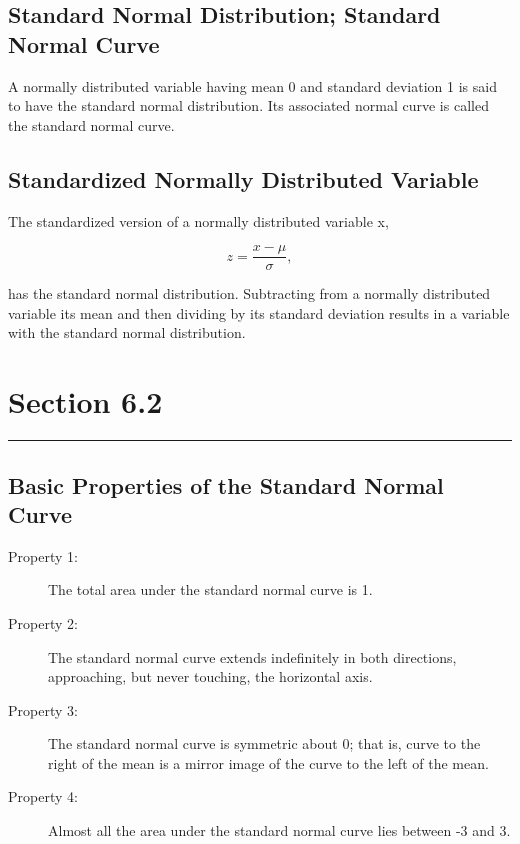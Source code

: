 \documentclass[12pt]{article}
\begin{document}
        \subsection*{Standard Normal Distribution; Standard Normal Curve}
            A normally distributed variable having mean 0 and standard deviation 1 is said to
            have the standard normal distribution. Its associated normal curve is called the
            standard normal curve.
        \subsection*{Standardized Normally Distributed Variable}
            The standardized version of a normally distributed variable x,
            \begin{center}
                \[
                    z = \frac{x - \mu}{\sigma}, 
                \]
            \end{center}
            has the standard normal distribution. Subtracting from a normally distributed variable
            its mean and then dividing by its standard deviation results in a variable with the
            standard normal distribution.

    \section*{Section 6.2}
    \noindent\rule{\textwidth}{0.4pt}
        \subsection*{Basic Properties of the Standard Normal Curve}
            \begin{description}
                \item[Property 1:] The total area under the standard normal curve is 1.
                \item[Property 2:] The standard normal curve extends indefinitely in both
                directions, approaching, but never touching, the horizontal axis.                 
                \item[Property 3:] The standard normal curve is symmetric about 0; that is, curve
                to the right of the mean is a mirror image of the curve to the left of the mean.
                \item[Property 4:] Almost all the area under the standard normal curve lies between
                -3 and 3.  
            \end{description}
\end{document}

